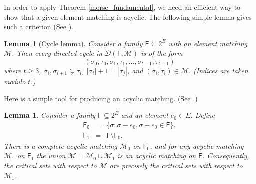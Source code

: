 \documentclass[10pt]{amsart}
\newcommand{\PP}{\mathcal{P}}
\newcommand{\MM}{\mathcal{M}}
\newcommand{\DD}{\mathcal{D}}
\newtheorem{lemma}[thm]{Lemma}
\theoremstyle{definition}
\begin{document}
	\medskip
	
	In order to apply Theorem \ref{morse_fundamental}, we need an efficient way to show that a given element matching is acyclic. The following simple lemma gives such a criterion (See \cite[section 4.2]{jonsson_complex_graph}).
	
	\begin{lemma}[Cycle lemma]\label{cycle} Consider a family $\mathsf{F} \subseteq 2^E$ with an element matching $\mathcal{M}$. Then every directed cycle in $\mathcal{D}(\mathsf{F}, \mathcal{M})$ is of the form \[(\sigma_0, \tau_0, \sigma_1, \tau_1, \dots, \sigma_{t-1}, \tau_{t-1})\] where $t\geq 3$,  $\sigma_i, \sigma_{i+1} \subsetneq \tau_i$, $|\sigma_i|+1 = |\tau_j|$, and $(\sigma_i, \tau_i)\in \mathcal{M}$. (Indices are taken modulo $t$.)

	\end{lemma}
	
	
	Here is a simple tool for producing an acyclic matching. (See \cite[Lemma 4.1]{jonsson_complex_graph}.) 
	
	
	\begin{lemma}\label{boolean}
		Consider a family $\mathsf{F}\subseteq 2^E$ and an element $e_0\in E$. Define 
		\[\begin{array}{rcl}
		\mathsf{F_0} & = & \{\sigma : \sigma-e_0, \sigma+ e_0 \in \mathsf{F}\},\\
		\mathsf{F}_1 & = & \mathsf{F}\setminus \mathsf{F}_0.
		\end{array}\]
		There is a complete acyclic matching $\mathcal{M}_0$ on $\mathsf{F}_0$, and for any acyclic matching $\mathcal{M}_1$ on $\mathsf{F}_1$ the union $\mathcal{M} = \mathcal{M}_0 \cup \mathcal{M}_1$ is an acyclic matching on $\mathsf{F}$. Consequently, the critical sets with respect to $\mathcal{M}$ are precisely the critical sets with respect to $\mathcal{M}_1$.
	\end{lemma}
	
\end{document}
